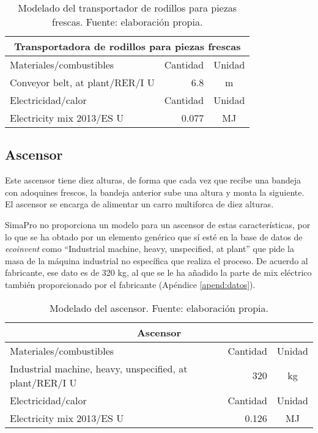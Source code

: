 \begin{table}[!htb]
\centering
\begin{tabular}{p{8cm}rc}
\toprule
\multicolumn{3}{c}{Transportadora de rodillos para piezas frescas}\\
\midrule
Materiales/combustibles & Cantidad & Unidad\\
\midrule
Conveyor belt, at plant/RER/I U & 6.8 & \si{m}\\
\midrule
Electricidad/calor & Cantidad & Unidad\\
\midrule
Electricity mix 2013/ES U & 0.077 & \si{MJ}\\
\bottomrule
\end{tabular}
\caption[Modelado del transportador de rodillos para piezas frescas.]{Modelado del transportador de rodillos para piezas frescas. Fuente: elaboración propia.}
\label{modeladotransportadorpiezas}
\end{table}

\subsection{Ascensor}

Este ascensor tiene diez alturas, de forma que cada vez que recibe una bandeja con adoquines frescos, la bandeja anterior sube una altura y monta la siguiente. El ascensor se encarga de alimentar un carro multiforca de diez alturas.

SimaPro no proporciona un modelo para un ascensor de estas características, por lo que se ha obtado por un elemento genérico que sí esté en la base de datos de \textit{ecoinvent} como ``Industrial machine, heavy, unspecified, at plant'' que pide la masa de la máquina industrial no específica que realiza el proceso. De acuerdo al fabricante, ese dato es de 320 \si{kg}, al que se le ha añadido la parte de mix eléctrico también proporcionado por el fabricante (Apéndice \ref{apend:datos}).

\begin{table}[!htb]
\centering
\begin{tabular}{p{8cm}rc}
\toprule
\multicolumn{3}{c}{Ascensor}\\
\midrule
Materiales/combustibles & Cantidad & Unidad\\
\midrule
Industrial machine, heavy, unspecified, at plant/RER/I U & 320 & \si{kg}\\
\midrule
Electricidad/calor & Cantidad & Unidad\\
\midrule
Electricity mix 2013/ES U & 0.126 & \si{MJ}\\
\bottomrule
\end{tabular}
\caption[Modelado del ascensor.]{Modelado del ascensor. Fuente: elaboración propia.}
\label{modeladodelascensor}
\end{table}

